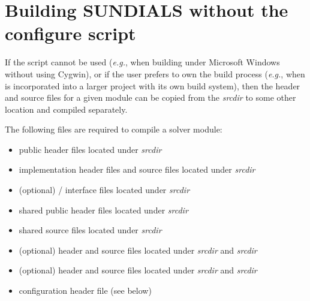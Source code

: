 
\section{Building SUNDIALS without the configure script}\label{ss:no_config}

If the  script cannot be used ({\em e.g.}, when building
{\sundials} under Microsoft Windows without using Cygwin), or if the
user prefers to own the build process ({\em e.g.}, when {\sundials} is
incorporated into a larger project with its own build system), then
the header and source files for a given module can be copied from the
{\em srcdir} to some other location and compiled separately.

The following files are required to compile a {\sundials} solver module:
\begin{itemize}
\item public header files located under 
{\em srcdir}
\item implementation header files and source files located under
{\em srcdir}
\item (optional) {\F}/{\C} interface files located under
{\em srcdir}
\item shared public header files located under
{\em srcdir}
\item shared source files located under
{\em srcdir}
\item (optional) {\nvecs} header and source files located under
{\em srcdir} and {\em srcdir} 
\item (optional) {\nvecp} header and source files located under
{\em srcdir} and {\em srcdir} 
\item configuration header file  (see below)
\end{itemize}

